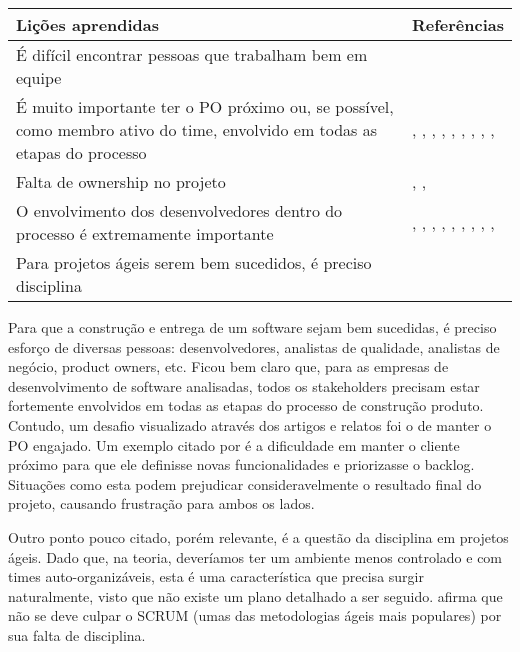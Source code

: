 \begin{table}[H]
	\centering
	\begin{tabularx}{\linewidth}{ | X | p{5cm} | } \hline \textbf{Lições aprendidas} & \textbf{Referências} \\ \hline
		É difícil encontrar pessoas que trabalham bem em equipe & \cite{Block2011} \\ \hline
		É muito importante ter o PO próximo ou, se possível, como membro ativo do time, envolvido em todas as etapas do processo & \cite{Block2011}, \cite{Asnawi2012}, \cite{Lapham2012}, \cite{Microsoft2013}, \cite{Claudia2013}, \cite{Piegas2012}, \cite{Parzinello2012}, \cite{Stefano2013}, \cite{Rodrigues2013}, \cite{Maciel2013} \\ \hline
		Falta de ownership no projeto & \cite{Block2011}, \cite{Nokia2013}, \cite{Queiroz2013} \\ \hline
		O envolvimento dos desenvolvedores dentro do processo é extremamente importante & \cite{Asnawi2012}, \cite{Adobe2012}, \cite{Fitzgerald2013}, \cite{Lapham2012}, \cite{Microsoft2013}, \cite{Claudia2013}, \cite{Stefano2013}, \cite{Bastos2013}, \cite{Maciel2013}, \cite{Ahmed2008} \\ \hline
		Para projetos ágeis serem bem sucedidos, é preciso disciplina & \cite{Parzinello2012} \\ \hline
	\end{tabularx}
\end{table}

%

Para que a construção e entrega de um software sejam bem sucedidas, é preciso esforço de diversas pessoas: desenvolvedores, analistas de qualidade, analistas de negócio, product owners, etc. Ficou bem claro que, para as empresas de desenvolvimento de software analisadas, todos os stakeholders precisam estar fortemente envolvidos em todas as etapas do processo de construção produto. Contudo, um desafio visualizado através dos artigos e relatos foi o de manter o PO engajado. Um exemplo citado por \cite{Block2011} é a dificuldade em manter o cliente próximo para que ele definisse novas funcionalidades e priorizasse o backlog. Situações como esta podem prejudicar consideravelmente o resultado final do projeto, causando frustração para ambos os lados.

Outro ponto pouco citado, porém relevante, é a questão da disciplina em projetos ágeis. Dado que, na teoria, deveríamos ter um ambiente menos controlado e com times auto-organizáveis, esta é uma característica que precisa surgir naturalmente, visto que não existe um plano detalhado a ser seguido. \cite{Parzinello2012} afirma que não se deve culpar o SCRUM (umas das metodologias ágeis mais populares) por sua falta de disciplina.

